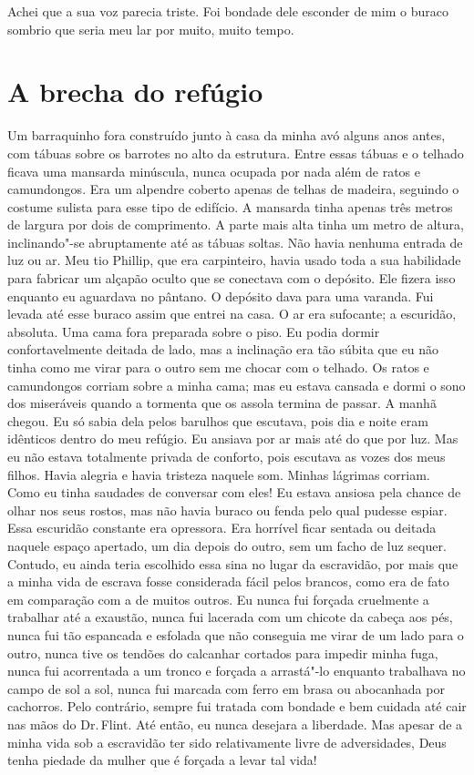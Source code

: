 Achei que a sua voz parecia triste. Foi
bondade dele esconder de mim o buraco sombrio que seria meu lar por
muito, muito tempo.

\chapter*{A brecha do refúgio}

Um barraquinho fora construído junto à
casa da minha avó alguns anos antes, com tábuas sobre os barrotes no
alto da estrutura. Entre essas tábuas e o telhado ficava uma mansarda
minúscula, nunca ocupada por nada além de ratos e camundongos. Era um
alpendre coberto apenas de telhas de madeira, seguindo o costume sulista
para esse tipo de edifício. A mansarda tinha apenas três metros de
largura por dois de comprimento. A parte mais alta tinha um metro de
altura, inclinando"-se abruptamente até as tábuas soltas. Não havia
nenhuma entrada de luz ou ar. Meu tio Phillip, que era carpinteiro,
havia usado toda a sua habilidade para fabricar um alçapão oculto que se
conectava com o depósito. Ele fizera isso enquanto eu aguardava no
pântano. O depósito dava para uma varanda. Fui levada até esse buraco
assim que entrei na casa. O ar era sufocante; a escuridão, absoluta. Uma
cama fora preparada sobre o piso. Eu podia dormir confortavelmente
deitada de lado, mas a inclinação era tão súbita que eu não tinha como
me virar para o outro sem me chocar com o telhado. Os ratos e
camundongos corriam sobre a minha cama; mas eu estava cansada e dormi o
sono dos miseráveis quando a tormenta que os assola termina de passar. A
manhã chegou. Eu só sabia dela pelos barulhos que escutava, pois dia e
noite eram idênticos dentro do meu refúgio. Eu ansiava por ar mais até
do que por luz. Mas eu não estava totalmente privada de conforto, pois
escutava as vozes dos meus filhos. Havia alegria e havia tristeza
naquele som. Minhas lágrimas corriam. Como eu tinha saudades de
conversar com eles! Eu estava ansiosa pela chance de olhar nos seus
rostos, mas não havia buraco ou fenda pelo qual pudesse espiar. Essa
escuridão constante era opressora. Era horrível ficar sentada ou deitada
naquele espaço apertado, um dia depois do outro, sem um facho de luz
sequer. Contudo, eu ainda teria escolhido essa sina no lugar da
escravidão, por mais que a minha vida de escrava fosse considerada fácil
pelos brancos, como era de fato em comparação com a de muitos outros.
Eu nunca fui forçada cruelmente a
trabalhar até a exaustão, nunca fui lacerada com um chicote da cabeça
aos pés, nunca fui tão espancada e esfolada que não conseguia me virar
de um lado para o outro, nunca tive os tendões do calcanhar cortados
para impedir minha fuga, nunca fui acorrentada a um tronco e forçada a
arrastá"-lo enquanto trabalhava no campo de sol a sol, nunca fui marcada
com ferro em brasa ou abocanhada por cachorros. Pelo contrário, sempre
fui tratada com bondade e bem cuidada até cair nas mãos do Dr.\,Flint.
Até então, eu nunca desejara a liberdade. Mas apesar de a minha vida sob
a escravidão ter sido relativamente livre de adversidades, Deus tenha
piedade da mulher que é forçada a levar tal vida!

